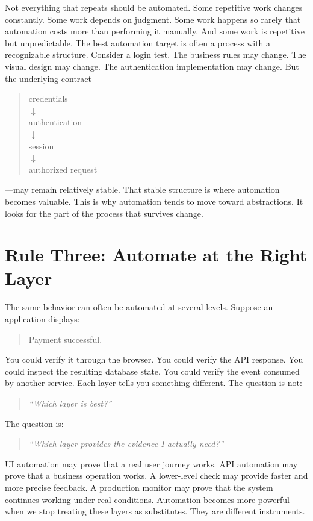 \documentclass[11pt,twoside]{book}
\begin{document}
Not everything that repeats should be automated.
Some repetitive work changes constantly.
Some work depends on judgment.
Some work happens so rarely that automation costs more than performing it manually.
And some work is repetitive but unpredictable.
The best automation target is often a process with a recognizable structure.
Consider a login test.
The business rules may change.
The visual design may change.
The authentication implementation may change.
But the underlying contract---
\begin{quote}
\centering
credentials\\
$\downarrow$\\
authentication\\
$\downarrow$\\
session\\
$\downarrow$\\
authorized request
\end{quote}
---may remain relatively stable.
That stable structure is where automation becomes valuable.
This is why automation tends to move toward abstractions.
It looks for the part of the process that survives change.

\section*{Rule Three: Automate at the Right Layer}

The same behavior can often be automated at several levels.
Suppose an application displays:
\begin{quote}
Payment successful.
\end{quote}
You could verify it through the browser.
You could verify the API response.
You could inspect the resulting database state.
You could verify the event consumed by another service.
Each layer tells you something different.
The question is not:
\begin{quote}
\emph{``Which layer is best?''}
\end{quote}
The question is:
\begin{quote}
\emph{``Which layer provides the evidence I actually need?''}
\end{quote}
UI automation may prove that a real user journey works.
API automation may prove that a business operation works.
A lower-level check may provide faster and more precise feedback.
A production monitor may prove that the system continues working under real conditions.
Automation becomes more powerful when we stop treating these layers as substitutes.
They are different instruments.
\end{document}
